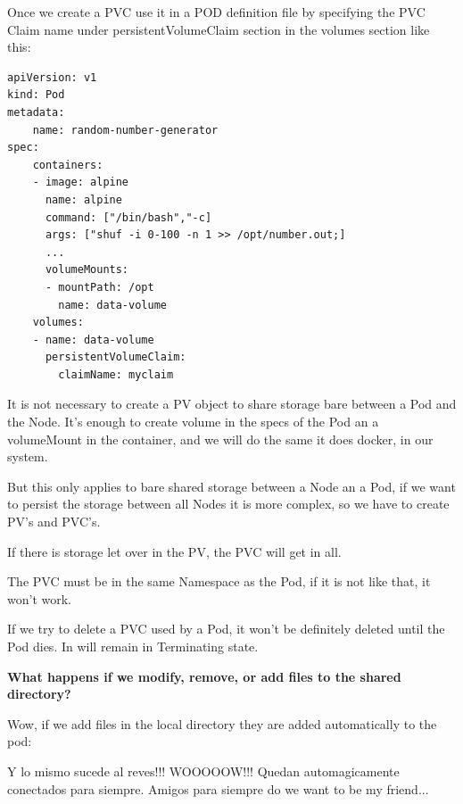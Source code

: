 \documentclass{article}
\newenvironment{blocktemplateIII}[1]{%
    \tcolorbox[beamer,%
    noparskip,breakable,
    ,colframe=Red,%
    colbacklower=LimeGreen!75!LightGreen,%
    title=#1]}%
    {\endtcolorbox}
\newenvironment{codetemplate}[1][]{%
  \mybasecolorbox[#1]
  \itshape
}{%
  \endmybasecolorbox
}
\begin{document}
Once we create a PVC use it in a POD definition file by specifying the PVC Claim name under persistentVolumeClaim section in the volumes section like this:

\begin{codetemplate}{}
\begin{verbatim}
apiVersion: v1
kind: Pod
metadata:
    name: random-number-generator
spec:
    containers:
    - image: alpine
      name: alpine
      command: ["/bin/bash","-c]
      args: ["shuf -i 0-100 -n 1 >> /opt/number.out;]
      ...
      volumeMounts:
      - mountPath: /opt
        name: data-volume
    volumes:
    - name: data-volume
      persistentVolumeClaim:
        claimName: myclaim
\end{verbatim}
\end{codetemplate}

\begin{blocktemplateIII}{WARNING}
It is not necessary to create a PV object to share storage bare between a Pod and the Node. It's enough to create volume in the specs of the Pod an a volumeMount in the container, and we will do the same it does docker, in our system. 

But this only applies to bare shared storage between a Node an a Pod, if we want to persist the storage between all Nodes it is more complex, so we have to create PV's and PVC's.
\end{blocktemplateIII}

\begin{blocktemplateIII}{WARNING}
If there is storage let over in the PV, the PVC will get in all.
\end{blocktemplateIII}

\begin{blocktemplateIII}{WARNING}
The PVC must be in the same Namespace as the Pod, if it is not like that, it won't work.
\end{blocktemplateIII}

\begin{blocktemplateIII}{WARNING}
If we try to delete a PVC used by a Pod, it won't be definitely deleted until the Pod dies. In will remain in Terminating state.
\end{blocktemplateIII}

\textbf{What happens if we modify, remove, or add files to the shared directory?}

Wow, if we add files in the local directory they are added automatically to the pod:

Y lo mismo sucede al reves!!! WOOOOOW!!! Quedan automagicamente conectados para siempre. Amigos para siempre do we want to be my friend...
\end{document}
